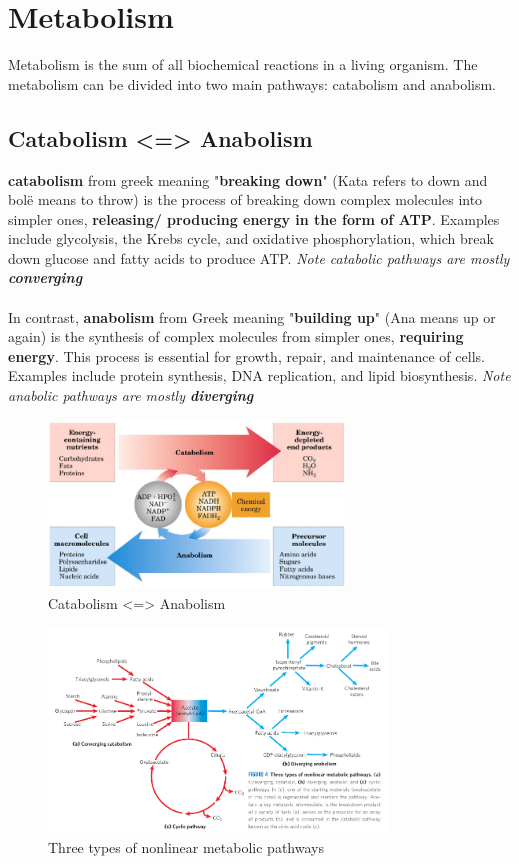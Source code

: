 \documentclass[../main.tex]{subfiles}
\begin{document}
\section{Metabolism}
Metabolism is the sum of all biochemical reactions in a living organism. The metabolism can be divided into two main pathways: catabolism and anabolism. 

\subsection{Catabolism <=> Anabolism}
\textbf{\gls{catabolism}} from greek meaning "\textbf{breaking down}" (Kata refers to down and bolë means to throw) is the process of breaking down complex molecules into simpler ones, \textbf{releasing/ producing energy in the form of ATP}. Examples include glycolysis, the Krebs cycle, and oxidative phosphorylation, which break down glucose and fatty acids to produce ATP. \textit{Note catabolic pathways are mostly \textbf{converging}} \\
\\
In contrast, \textbf{\gls{anabolism}} from Greek meaning "\textbf{building up}" (Ana means up or again) is the synthesis of complex molecules from simpler ones, \textbf{requiring energy}. This process is essential for growth, repair, and maintenance of cells. Examples include protein synthesis, DNA replication, and lipid biosynthesis. \textit{Note anabolic pathways are mostly \textbf{diverging}} 

\begin{figure}[H]
	\centering
	\includegraphics[width=0.7\textwidth]{cata_ana}
	\caption{Catabolism <=> Anabolism}
\end{figure}

\begin{figure}[H]
	\centering
	\includegraphics[width=0.8\textwidth]{pathways}
	\caption{Three types of nonlinear metabolic pathways}
\end{figure}

\end{document}
